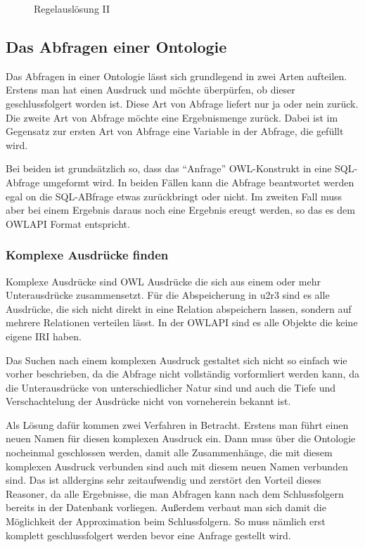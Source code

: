 \begin{figure}[htp]
\begin{center}
  \caption{Regelauslösung II}
  \label{diagram-ruleexecution2}
\end{center}
\end{figure}

\subsection{Das Abfragen einer Ontologie}
Das Abfragen in einer Ontologie lässt sich grundlegend in zwei Arten aufteilen. Erstens man hat einen Ausdruck und möchte überpürfen, ob dieser geschlussfolgert worden ist. Diese Art von Abfrage liefert nur ja oder nein zurück. Die zweite Art von Abfrage möchte eine Ergebnismenge zurück. Dabei ist im Gegensatz zur ersten Art von Abfrage eine Variable in der Abfrage, die gefüllt wird.

Bei beiden ist grundsätzlich so, dass das ``Anfrage'' OWL-Konstrukt in eine SQL-Abfrage umgeformt wird. In beiden Fällen kann die Abfrage beantwortet werden egal on die SQL-ABfrage etwas zurückbringt oder nicht. Im zweiten Fall muss aber bei einem Ergebnis daraus noch eine Ergebnis ereugt werden, so das es dem OWLAPI Format entspricht.

\subsubsection{Komplexe Ausdrücke finden}

Komplexe Ausdrücke sind OWL Ausdrücke die sich aus einem oder mehr Unterausdrücke zusammensetzt. Für die Abspeicherung in u2r3 sind es alle Ausdrücke, die sich nicht direkt in eine Relation abspeichern lassen, sondern auf mehrere Relationen verteilen lässt. In der OWLAPI sind es alle Objekte die keine eigene IRI haben.

Das Suchen nach einem komplexen Ausdruck gestaltet sich nicht so einfach wie vorher beschrieben, da die Abfrage nicht vollständig vorformliert werden kann, da die Unterausdrücke von unterschiedlicher Natur sind und auch die Tiefe und Verschachtelung der Ausdrücke nicht von vorneherein bekannt ist.

Als Lösung dafür kommen zwei Verfahren in Betracht. Erstens man führt einen neuen Namen für diesen komplexen Ausdruck ein. Dann muss über die Ontologie nocheinmal geschlossen werden, damit alle Zusammenhänge, die mit diesem komplexen Ausdruck verbunden sind auch mit diesem neuen Namen verbunden sind. Das ist alldergins sehr zeitaufwendig und zerstört den Vorteil dieses Reasoner, da alle Ergebnisse, die man Abfragen kann nach dem Schlussfolgern bereits in der Datenbank vorliegen. Außerdem verbaut man sich damit die Möglichkeit der Approximation beim Schlussfolgern. So muss nämlich erst komplett geschlussfolgert werden bevor eine Anfrage gestellt wird.


